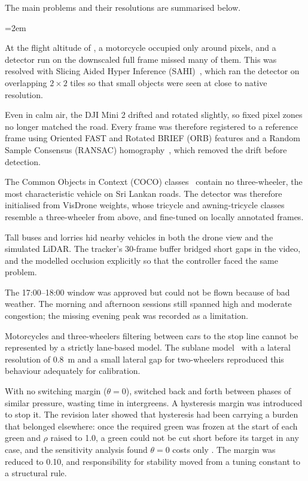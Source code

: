 The main problems and their resolutions are summarised below.

{\emergencystretch=2em
\begin{description}[leftmargin=0pt,style=unboxed]
\item[Tiny motorcycles in aerial video.] At the flight altitude of , a motorcycle occupied only around  pixels, and a detector run on the downscaled full frame missed many of them. This was resolved with Slicing Aided Hyper Inference (SAHI)~\cite{akyon2022sahi}, which ran the detector on overlapping $2\times2$ tiles so that small objects were seen at close to native resolution.
\item[Drone hover drift.] Even in calm air, the DJI Mini 2 drifted and rotated slightly, so fixed pixel zones no longer matched the road. Every frame was therefore registered to a reference frame using Oriented FAST and Rotated BRIEF (ORB) features and a Random Sample Consensus (RANSAC) homography~\cite{rublee2011orb,fischler1981ransac}, which removed the drift before detection.
\item[Three-wheelers absent from standard datasets.] The Common Objects in Context (COCO) classes~\cite{lin2014coco} contain no three-wheeler, the most characteristic vehicle on Sri Lankan roads. The detector was therefore initialised from VisDrone weights, whose tricycle and awning-tricycle classes~\cite{zhu2022visdrone} resemble a three-wheeler from above, and fine-tuned on  locally annotated frames.
\item[Occlusion by buses.] Tall buses and lorries hid nearby vehicles in both the drone view and the simulated LiDAR. The tracker's 30-frame buffer bridged short gaps in the video, and the \vls{} modelled occlusion explicitly so that the controller faced the same problem.
\item[Lost evening session.] The 17:00--18:00 window was approved but could not be flown because of bad weather. The morning and afternoon sessions still spanned high and moderate congestion; the missing evening peak was recorded as a limitation.
\item[Lane-less filtering in \sumo{}.] Motorcycles and three-wheelers filtering between cars to the stop line cannot be represented by a strictly lane-based model. The sublane model~\cite{sumo_sublane} with a lateral resolution of 0.8~m and a small lateral gap for two-wheelers reproduced this behaviour adequately for calibration.
\item[Phase oscillation.] With no switching margin ($\theta=0$), \prism{} switched back and forth between phases of similar pressure, wasting time in intergreens. A hysteresis margin was introduced to stop it. The revision later showed that hysteresis had been carrying a burden that belonged elsewhere: once the required green was frozen at the start of each green and $\rho$ raised to 1.0, a green could not be cut short before its target in any case, and the sensitivity analysis found $\theta=0$ costs only . The margin was reduced to 0.10, and responsibility for stability moved from a tuning constant to a structural rule.

\end{description}}

